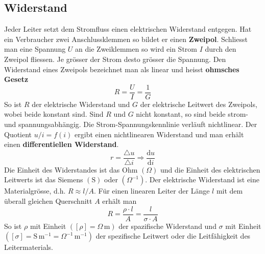 \subsection{Widerstand}
Jeder Leiter setzt dem Stromfluss einen elektrischen Widerstand entgegen. Hat ein Verbraucher zwei Anschlussklemmen so bildet er einen \textbf{Zweipol}. Schliesst man eine Spannung $U$ an die Zweiklemmen so wird ein Strom $I$ durch den Zweipol fliessen. Je grösser der Strom desto grösser die Spannung. Den Widerstand eines Zweipols bezeichnet man als linear und heisst \textbf{ohmsches Gesetz}
\begin{equation}
\boxed{R=\dfrac{U}{I}=\dfrac{1}{G}}
\end{equation}
So ist $R$ der elektrische Widerstand und $G$ der elektrische Leitwert des Zweipols, wobei beide konstant sind. Sind $R$ und $G$ nicht konstant, so sind beide strom- und spannungsabhängig. Die Strom-Spannungskennlinie verläuft nichtlinear. Der Quotient $u/i=f\left(i\right)$ ergibt einen nichtlinearen Widerstand und man erhält einen \textbf{differentiellen Widerstand}.
\begin{equation}
\boxed{r=\dfrac{\triangle u}{\triangle i}\Longrightarrow \dfrac{\text{d}u}{\text{d}i}}
\end{equation}
Die Einheit des Widerstandes ist das Ohm $\left(\Omega\right)$ und die Einheit des elektrischen Leitwerts ist das Siemens $\left(\text{S}\right)$ oder $\left(\Omega^{-1}\right)$. Der elektrische Widerstand ist eine Materialgrösse, d.h. $R\approx l/A$. Für einen linearen Leiter der Länge $l$ mit dem überall gleichen Querschnitt $A$ erhält man
\begin{equation}
\boxed{R=\dfrac{\rho\cdot l}{A}=\dfrac{l}{\sigma\cdot A}}
\end{equation}
So ist $\rho$ mit Einheit $\left([\rho]=\Omega\,\text{m}\right)$ der spazifische Widerstand und $\sigma$ mit Einheit $\left([\sigma]=\text{S}\,\text{m}^{-1}=\Omega^{-1}\,\text{m}^{-1}\right)$ der spezifische Leitwert oder die Leitfähigkeit des Leitermaterials.

